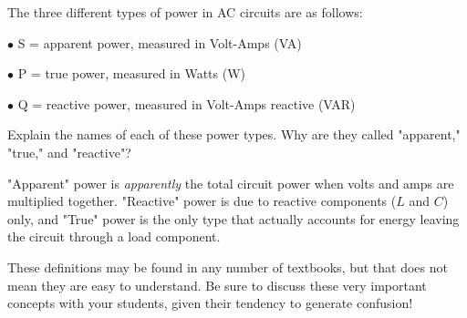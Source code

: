 

The three different types of power in AC circuits are as follows:

\medskip
\goodbreak
\item{$\bullet$} S = apparent power, measured in Volt-Amps (VA)
\item{$\bullet$} P = true power, measured in Watts (W)
\item{$\bullet$} Q = reactive power, measured in Volt-Amps reactive (VAR)
\medskip

Explain the names of each of these power types.  Why are they called "apparent," "true," and "reactive"?







"Apparent" power is {\it apparently} the total circuit power when volts and amps are multiplied together.  "Reactive" power is due to reactive components ($L$ and $C$) only, and "True" power is the only type that actually accounts for energy leaving the circuit through a load component.







These definitions may be found in any number of textbooks, but that does not mean they are easy to understand.  Be sure to discuss these very important concepts with your students, given their tendency to generate confusion!




